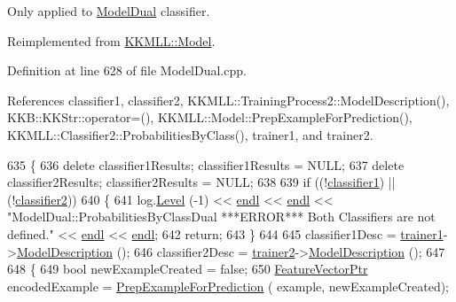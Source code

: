 Only applied to \hyperlink{class_k_k_m_l_l_1_1_model_dual}{Model\+Dual} classifier. 



Reimplemented from \hyperlink{class_k_k_m_l_l_1_1_model_a290ddc0fe37384ff05ba32f88dc01384}{K\+K\+M\+L\+L\+::\+Model}.



Definition at line 628 of file Model\+Dual.\+cpp.



References classifier1, classifier2, K\+K\+M\+L\+L\+::\+Training\+Process2\+::\+Model\+Description(), K\+K\+B\+::\+K\+K\+Str\+::operator=(), K\+K\+M\+L\+L\+::\+Model\+::\+Prep\+Example\+For\+Prediction(), K\+K\+M\+L\+L\+::\+Classifier2\+::\+Probabilities\+By\+Class(), trainer1, and trainer2.


\begin{DoxyCode}
635 \{
636   \textcolor{keyword}{delete}  classifier1Results;  classifier1Results = NULL;
637   \textcolor{keyword}{delete}  classifier2Results;  classifier2Results = NULL;
638 
639   \textcolor{keywordflow}{if}  ((!\hyperlink{class_k_k_m_l_l_1_1_model_dual_a702b5e302cc05ab6cdc3ee4ae8115622}{classifier1})  ||  (!\hyperlink{class_k_k_m_l_l_1_1_model_dual_a18ed538fadc0cb3eebdb9175ccce22e2}{classifier2}))
640   \{
641     log.\hyperlink{class_k_k_b_1_1_run_log_a32cf761d7f2e747465fd80533fdbb659}{Level} (-1) << \hyperlink{namespace_k_k_b_ad1f50f65af6adc8fa9e6f62d007818a8}{endl} << \hyperlink{namespace_k_k_b_ad1f50f65af6adc8fa9e6f62d007818a8}{endl} << \textcolor{stringliteral}{"ModelDual::ProbabilitiesByClassDual   ***ERROR***     
       Both Classifiers are not defined."} << \hyperlink{namespace_k_k_b_ad1f50f65af6adc8fa9e6f62d007818a8}{endl} << \hyperlink{namespace_k_k_b_ad1f50f65af6adc8fa9e6f62d007818a8}{endl};
642     \textcolor{keywordflow}{return};
643   \}
644 
645   classifier1Desc = \hyperlink{class_k_k_m_l_l_1_1_model_dual_ac70e06e4290a0eca3cb79892170fdf6c}{trainer1}->\hyperlink{class_k_k_m_l_l_1_1_training_process2_a24b79caa21bb8cfa2d74ec0ef5d2ed1c}{ModelDescription} ();
646   classifier2Desc = \hyperlink{class_k_k_m_l_l_1_1_model_dual_aed7b1f99f54b08770555fb1e9c5d4b21}{trainer2}->\hyperlink{class_k_k_m_l_l_1_1_training_process2_a24b79caa21bb8cfa2d74ec0ef5d2ed1c}{ModelDescription} ();
647 
648   \{
649     \textcolor{keywordtype}{bool}  newExampleCreated = \textcolor{keyword}{false};
650     \hyperlink{class_k_k_m_l_l_1_1_feature_vector}{FeatureVectorPtr}  encodedExample = \hyperlink{class_k_k_m_l_l_1_1_model_a31b972adfb64769b3ae966debec824fd}{PrepExampleForPrediction} (
      example, newExampleCreated);

\end{DoxyCode}
